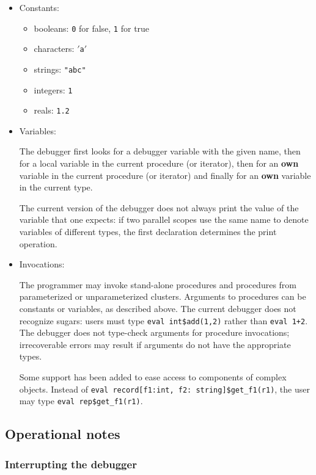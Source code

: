 \begin{itemize}
\item{Constants:}
\begin{itemize}
\item{booleans: {\tt 0} for false, {\tt 1} for true}
\item{characters: {\tt $'$a$'$}}
\item{strings: {\tt "abc"}}
\item{integers: {\tt 1}}
\item{reals: {\tt 1.2}}
\end{itemize}

\item{Variables:}

The debugger first looks for a debugger variable with the given name, then for
a local variable in the current procedure (or iterator), then for an {\bf own}
variable in the current procedure (or iterator) and finally for an {\bf own}
variable in the current type.

The current version of the debugger does not always print the value of the
variable that one expects: if two parallel scopes use the same name to denote
variables of different types, the first declaration determines the print
operation.

\item{Invocations:}

The programmer may invoke stand-alone procedures and procedures 
from parameterized or unparameterized clusters.  Arguments to
procedures can be constants or variables, as described above.  The current
debugger does not recognize sugars: users must type {\tt eval int\$add(1,2)}
rather than {\tt eval 1+2}.  The debugger does not type-check arguments for
procedure invocations; irrecoverable errors may result if arguments do not have
the appropriate types.

Some support has been added to ease access to components of complex objects.
Instead of {\tt eval record[f1:int, f2: string]\$get\_f1(r1)}, the user may
type {\tt eval rep\$get\_f1(r1)}.
\end{itemize}

\subsection{Operational notes}

\subsubsection{Interrupting the debugger}

